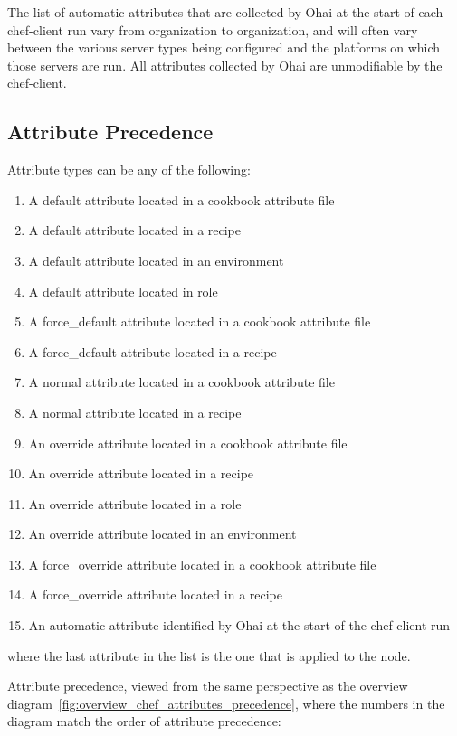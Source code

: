 The list of automatic attributes that are collected by Ohai at the start of each chef-client run vary from organization to organization, and will often vary between the various server types being configured and the platforms on which those servers are run. All attributes collected by Ohai are unmodifiable by the chef-client.

\subsection{Attribute Precedence}

Attribute types can be any of the following:

\begin{enumerate}
  \item A default attribute located in a cookbook attribute file
  \item A default attribute located in a recipe
  \item A default attribute located in an environment
  \item A default attribute located in role
  \item A force\_default attribute located in a cookbook attribute file
  \item A force\_default attribute located in a recipe
  \item A normal attribute located in a cookbook attribute file
  \item A normal attribute located in a recipe
  \item An override attribute located in a cookbook attribute file
  \item An override attribute located in a recipe
  \item An override attribute located in a role
  \item An override attribute located in an environment
  \item A force\_override attribute located in a cookbook attribute file
  \item A force\_override attribute located in a recipe
  \item An automatic attribute identified by Ohai at the start of the chef-client run
\end{enumerate}

where the last attribute in the list is the one that is applied to the node.

Attribute precedence, viewed from the same perspective as the overview diagram~\ref{fig:overview_chef_attributes_precedence}, where the numbers in the diagram match the order of attribute precedence:

